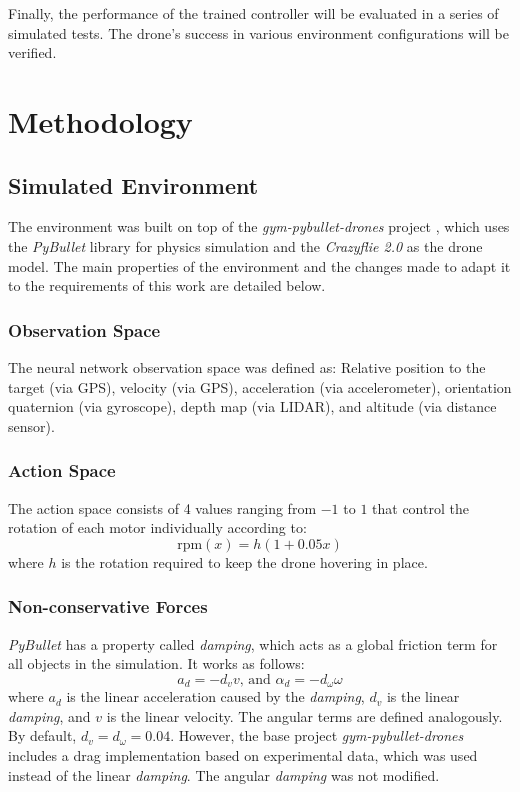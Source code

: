 \documentclass[12pt]{article}
\theoremstyle{definition}
\begin{document}
Finally, the performance of the trained controller will be evaluated in a series of simulated tests. The drone's success in various environment configurations will be verified.

\section{Methodology}
\subsection{Simulated Environment}
The environment was built on top of the \textit{gym-pybullet-drones} project \cite{panerati2021learning}, which uses the \textit{PyBullet} library \cite{coumans2019} for physics simulation and the \textit{Crazyflie 2.0} \cite{forster2015system} as the drone model. The main properties of the environment and the changes made to adapt it to the requirements of this work are detailed below.

\subsubsection{Observation Space}
The neural network observation space was defined as: Relative position to the target (via GPS), velocity (via GPS), acceleration (via accelerometer), orientation quaternion (via gyroscope), depth map (via LIDAR), and altitude (via distance sensor).

\subsubsection{Action Space}
The action space consists of 4 values ranging from $-1$ to $1$ that control the rotation of each motor individually according to:
\[
\text{rpm}(x) = h (1 + 0.05x)
\]
where $h$ is the rotation required to keep the drone hovering in place.

\subsubsection{Non-conservative Forces}
\textit{PyBullet} has a property called \textit{damping}, which acts as a global friction term for all objects in the simulation. It works as follows:
\[
a_d = -d_v v
\text{, and }
\alpha_d = -d_\omega \omega
\]
where $a_d$ is the linear acceleration caused by the \textit{damping}, $d_v$ is the linear \textit{damping}, and $v$ is the linear velocity. The angular terms are defined analogously. \newline
By default, $d_v = d_\omega = 0.04$. However, the base project \textit{gym-pybullet-drones} includes a drag implementation based on experimental data, which was used instead of the linear \textit{damping}. The angular \textit{damping} was not modified.
\end{document}
